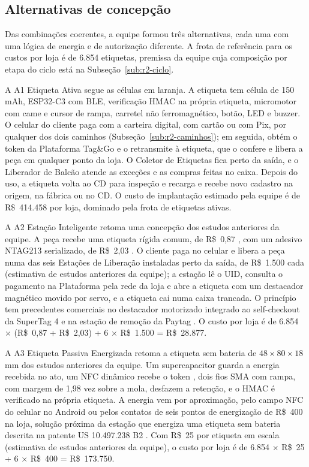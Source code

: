 \subsection{Alternativas de concepção}

Das combinações coerentes, a equipe formou três alternativas, cada uma com uma lógica de energia e de autorização diferente. A frota de referência para os custos por loja é de 6.854 etiquetas, premissa da equipe cuja composição por etapa do ciclo está na Subseção~\ref{sub:r2-ciclo}.

A A1 Etiqueta Ativa segue as células em laranja. A etiqueta tem célula de 150\,mAh, ESP32-C3 com BLE, verificação HMAC na própria etiqueta, micromotor com came e cursor de rampa, carretel não ferromagnético, botão, LED e buzzer. O celular do cliente paga com a carteira digital, com cartão ou com Pix, por qualquer dos dois caminhos (Subseção~\ref{sub:r2-caminhos}); em seguida, obtém o token da Plataforma Tag\&Go e o retransmite à etiqueta, que o confere e libera a peça em qualquer ponto da loja. O Coletor de Etiquetas fica perto da saída, e o Liberador de Balcão atende as exceções e as compras feitas no caixa. Depois do uso, a etiqueta volta ao CD para inspeção e recarga e recebe novo cadastro na origem, na fábrica ou no CD. O custo de implantação estimado pela equipe é de R\$~414.458 por loja, dominado pela frota de etiquetas ativas.

A A2 Estação Inteligente retoma uma concepção dos estudos anteriores da equipe. A peça recebe uma etiqueta rígida comum, de R\$~0,87 \cite{allcard2026minitag}, com um adesivo NTAG213 serializado, de R\$~2,03 \cite{smartkits2026ntag}. O cliente paga no celular e libera a peça numa das seis Estações de Liberação instaladas perto da saída, de R\$~1.500 cada (estimativa de estudos anteriores da equipe); a estação lê o UID, consulta o pagamento na Plataforma pela rede da loja e abre a etiqueta com um destacador magnético movido por servo, e a etiqueta cai numa caixa trancada. O princípio tem precedentes comerciais no destacador motorizado integrado ao self-checkout da SuperTag 4 \cite{sensormatic2026supertag} e na estação de remoção da Paytag \cite{calcalist2026paytag}. O custo por loja é de 6.854 $\times$ (R\$~0,87 + R\$~2,03) + 6 $\times$ R\$~1.500 = R\$~28.877.

A A3 Etiqueta Passiva Energizada retoma a etiqueta sem bateria de $48 \times 80 \times 18$\,mm dos estudos anteriores da equipe. Um supercapacitor guarda a energia recebida no ato, um NFC dinâmico recebe o token \cite{stm2017st25dv}, dois fios SMA com rampa, com margem de 1,98 vez sobre a mola, desfazem a retenção, e o HMAC é verificado na própria etiqueta. A energia vem por aproximação, pelo campo NFC do celular no Android ou pelos contatos de seis pontos de energização de R\$~400 na loja, solução próxima da estação que energiza uma etiqueta sem bateria descrita na patente US 10.497.238 B2 \cite{googlepatents2019us10497238}. Com R\$~25 por etiqueta em escala (estimativa de estudos anteriores da equipe), o custo por loja é de 6.854 $\times$ R\$~25 + 6 $\times$ R\$~400 = R\$~173.750.

